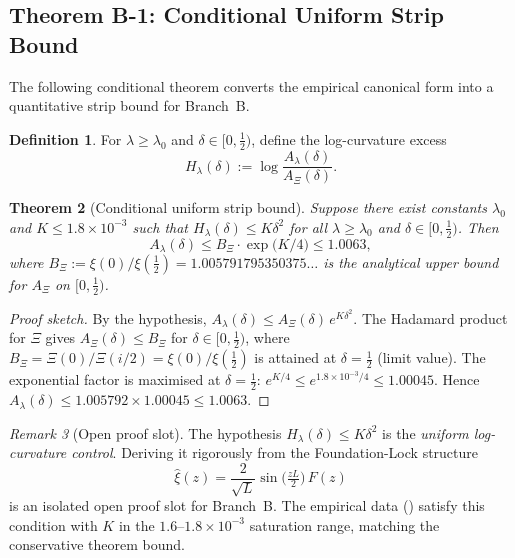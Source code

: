 \documentclass[12pt,a4paper]{article}
\newtheorem{theorem}{Theorem}[section]
\theoremstyle{definition}
\newtheorem{definition}[theorem]{Definition}
\theoremstyle{remark}
\newtheorem{remark}[theorem]{Remark}
\begin{document}
\subsection{Theorem B-1: Conditional Uniform Strip Bound}
\label{sec:theorem-b1}

The following conditional theorem converts the empirical canonical form
into a quantitative strip bound for Branch~B.

\begin{definition}\label{def:H-lambda}
For $\lambda \geq \lambda_0$ and $\delta \in [0, \tfrac{1}{2})$, define
the log-curvature excess
\[
  H_\lambda(\delta) := \log\frac{A_\lambda(\delta)}{A_\Xi(\delta)}.
\]
\end{definition}

\begin{theorem}[Conditional uniform strip bound]
\label{thm:B1}
Suppose there exist constants $\lambda_0$ and
$K \leq 1.8\times 10^{-3}$ such that
$H_\lambda(\delta) \leq K\delta^2$ for all
$\lambda \geq \lambda_0$ and $\delta \in [0, \tfrac{1}{2})$. Then
\begin{equation}\label{eq:B1-bound}
  A_\lambda(\delta)
  \leq B_\Xi \cdot \exp\!\bigl(K/4\bigr)
  \leq 1.0063,
\end{equation}
where $B_\Xi := \xi(0)/\xi(\tfrac{1}{2})
= 1.005791795350375\ldots$ is the analytical upper bound for
$A_\Xi$ on $[0,\tfrac{1}{2})$.
\end{theorem}

\begin{proof}[Proof sketch]
By the hypothesis, $A_\lambda(\delta) \leq A_\Xi(\delta)\,e^{K\delta^2}$.
The Hadamard product for $\Xi$ gives
$A_\Xi(\delta) \leq B_\Xi$ for $\delta \in [0,\tfrac{1}{2})$, where
$B_\Xi = \Xi(0)/\Xi(i/2) = \xi(0)/\xi(\tfrac{1}{2})$ is attained
at $\delta = \tfrac{1}{2}$ (limit value). The exponential factor is
maximised at $\delta = \tfrac{1}{2}$:
$e^{K/4} \leq e^{1.8\times 10^{-3}/4} \leq 1.00045$.
Hence $A_\lambda(\delta) \leq 1.005792 \times 1.00045 \leq 1.0063$.
\end{proof}

\begin{remark}[Open proof slot]
The hypothesis $H_\lambda(\delta) \leq K\delta^2$ is the
\emph{uniform log-curvature control}. Deriving it rigorously from
the Foundation-Lock structure
\[
  \hat\xi(z) = \frac{2}{\sqrt{L}}\sin\!\bigl(\tfrac{zL}{2}\bigr)\,F(z)
\]
is an isolated open proof slot for Branch~B. The empirical data
() satisfy this condition with
$K$ in the $1.6$--$1.8\times 10^{-3}$ saturation range, matching the
conservative theorem bound.
\end{remark}
\end{document}
